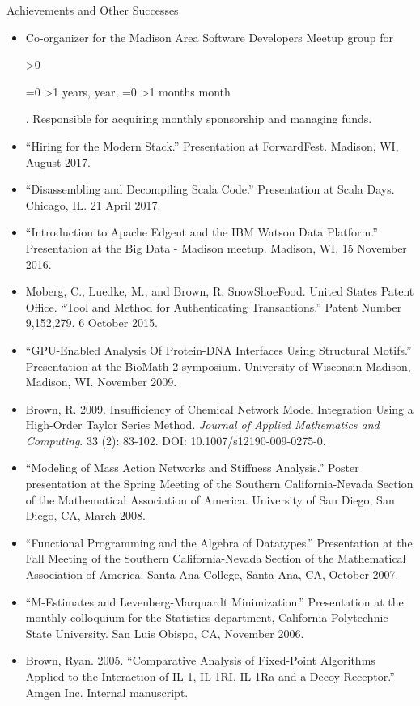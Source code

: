 \documentclass[11pt,oneside]{article}
\newenvironment{ressection}[1]{
	\vspace{4pt}
	{\fontfamily{phv}\selectfont\Large#1}
	\begin{itemize}[label={--}]
	\vspace{3pt}
}{
	\end{itemize}
}
\newcommand{\resitem}[1]{
	\vspace{-4pt}
	\item \begin{flushleft} #1 \end{flushleft}
}
\newcounter{datetoday}
\newcounter{diffyears}
\newcounter{diffmonths}
\newcounter{diffdays}
\newcommand{\difftoday}[3]{%
      \setmydatenumber{datetoday}{\the\year}{\the\month}{\the\day}%
      \setmydatenumber{diffdays}{#1}{#2}{#3}%
      \addtocounter{diffdays}{-\thedatetoday}%
      \ifnum\value{diffdays}>0
        \def\diffbefore{in }%
        \def\diffafter{}%
      \else
        \def\diffbefore{}%
        \def\diffafter{}%
        \setcounter{diffdays}{-\value{diffdays}}%
      \fi
      \setcounter{diffyears}{\value{diffdays}/365}%
      \setcounter{diffdays}{\value{diffdays}-365*\value{diffyears}}%
      \setcounter{diffmonths}{\value{diffdays}/30}%
      \setcounter{diffdays}{\value{diffdays}-30*\value{diffmonths}}%
      \diffbefore
      \ifnum\value{diffyears}=0
      \else
        \ifnum\value{diffyears}>1
            \thediffyears\space years,
        \else
            \thediffyears\space year,
        \fi
      \fi
      \ifnum\value{diffmonths}=0
      \else
        \ifnum\value{diffmonths}>1
            \thediffmonths\space months
        \else
            \thediffmonths\space month
        \fi
      \fi
      \diffafter
}
\begin{document}
\begin{ressection}{Achievements and Other Successes}
\resitem{Co-organizer for the Madison Area Software Developers Meetup group for  \difftoday{2012}{11}{10}. Responsible for acquiring monthly sponsorship and managing funds.}

\resitem{``Hiring for the Modern Stack.'' Presentation at ForwardFest. Madison, WI, August 2017.}

\resitem{``Disassembling and Decompiling Scala Code.'' Presentation at Scala Days. Chicago, IL. 21 April 2017.}

\resitem{``Introduction to Apache Edgent and the IBM Watson Data Platform.'' Presentation at the Big Data - Madison meetup. Madison, WI, 15 November 2016.}


\resitem{Moberg, C., Luedke, M., and Brown, R. SnowShoeFood. United States Patent Office. ``Tool and Method for Authenticating Transactions.'' Patent Number 9,152,279. 6 October 2015.}



\resitem{``GPU-Enabled Analysis Of Protein-DNA Interfaces Using Structural Motifs.'' Presentation at the BioMath 2 symposium. University of Wisconsin-Madison, Madison, WI. November 2009.}

\resitem{Brown, R. 2009.  Insufficiency of Chemical Network Model Integration Using a High-Order Taylor Series Method. \emph{Journal of Applied Mathematics and Computing}. 33 (2): 83-102. DOI: 10.1007/s12190-009-0275-0.}

\resitem{``Modeling of Mass Action Networks and Stiffness Analysis.'' Poster presentation at the Spring Meeting of the Southern California-Nevada Section of the Mathematical Association of America. University of San Diego, San Diego, CA, March 2008.}

\resitem{``Functional Programming and the Algebra of Datatypes.'' Presentation at the Fall Meeting of the Southern California-Nevada Section of the Mathematical Association of America. Santa Ana College, Santa Ana, CA, October 2007.}

\resitem{``M-Estimates and Levenberg-Marquardt Minimization.'' Presentation at the monthly colloquium for the Statistics department, California Polytechnic State University. San Luis Obispo, CA, November 2006.}

\resitem{Brown, Ryan. 2005. ``Comparative Analysis of Fixed-Point Algorithms Applied to the Interaction of IL-1, IL-1RI, IL-1Ra and a Decoy Receptor.'' Amgen Inc. Internal manuscript.}
\end{ressection}
\end{document}
